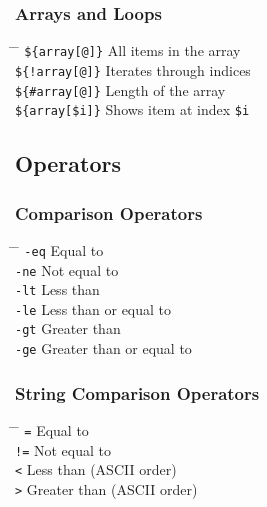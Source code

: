 \documentclass[a4paper,10pt]{article}
\begin{document}
\subsubsection*{Arrays and Loops}
\begin{tabbing}
	\= \hspace{30mm} \= \hspace{50mm} \kill
	\> \verb|${array[@]}| \> All items in the array \\
	\> \verb|${!array[@]}| \> Iterates through indices \\
	\> \verb|${#array[@]}| \> Length of the array \\
	\> \verb|${array[$i]}| \> Shows item at index \verb|$i| \\
\end{tabbing}

\subsection{Operators}
\subsubsection*{Comparison Operators}
\begin{tabbing}
	\= \hspace{30mm} \= \hspace{50mm} \kill
	\> \verb|-eq| \> Equal to \\
	\> \verb|-ne| \> Not equal to \\
	\> \verb|-lt| \> Less than \\
	\> \verb|-le| \> Less than or equal to \\
	\> \verb|-gt| \> Greater than \\
	\> \verb|-ge| \> Greater than or equal to \\
\end{tabbing}

\subsubsection*{String Comparison Operators}
\begin{tabbing}
	\= \hspace{30mm} \= \hspace{50mm} \kill
	\> \verb|=| \> Equal to \\
	\> \verb|!=| \> Not equal to \\
	\> \verb|<| \> Less than (ASCII order) \\
	\> \verb|>| \> Greater than (ASCII order) \\
\end{tabbing}
\end{document}
